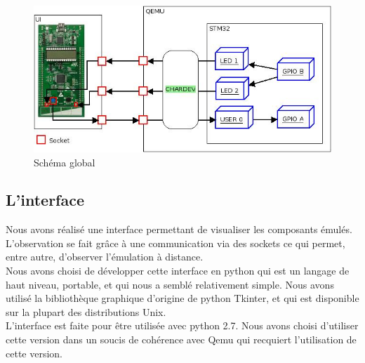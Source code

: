 \documentclass{article}
\begin{document}
	\begin{figure}
	  \caption{Schéma global}
	  \centering
	 \includegraphics[scale=0.6]{img/STM32qemu.jpeg}
	\end{figure}

			
	\subsection{L'interface}
		Nous avons réalisé une interface permettant de visualiser les composants émulés. L'observation se fait grâce à une communication
		via des sockets ce qui permet, entre autre, d'observer l'émulation à distance.\\
		Nous avons choisi de développer cette interface en python qui est un langage de haut niveau, portable, et qui nous a semblé 
		relativement simple. Nous avons utilisé la bibliothèque graphique d'origine de python Tkinter, et qui est disponible sur 
		la plupart des distributions Unix.\\
		L'interface est faite pour être utilisée avec python 2.7. Nous avons choisi d'utiliser cette version dans un soucis de 
		cohérence avec Qemu qui recquiert l'utilisation de cette version.
		
\end{document}
